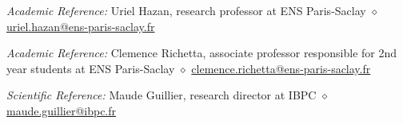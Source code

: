 \documentclass[
	10pt,
]{style} %
\begin{document}

\begin{rReferences}
	\vspace{-0.5em}
    \item \textit{Academic Reference:} Uriel Hazan, research professor at ENS Paris-Saclay $\diamond$ \href{mailto:uriel.hazan@ens-paris-saclay.fr}{uriel.hazan@ens-paris-saclay.fr}
	\item \textit{Academic Reference:} Clemence Richetta, associate professor responsible for 2nd year students at ENS Paris-Saclay $\diamond$ \href{mailto:clemence.richetta@ens-paris-saclay.fr}{clemence.richetta@ens-paris-saclay.fr}
	\item \textit{Scientific Reference:} Maude Guillier, research director at IBPC $\diamond$ \href{mailto:maude.guillier@ibpc.fr}{maude.guillier@ibpc.fr}
\end{rReferences}
\end{document}
